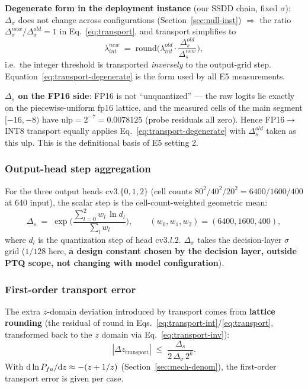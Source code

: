 \textbf{Degenerate form in the deployment instance} (our SSDD chain, fixed $\sigma$): $\Delta_\sigma$ does not change across configurations (Section~\ref{sec:null-inst}) $\Rightarrow$ the ratio $\Delta_\sigma^{new}/\Delta_\sigma^{old}=1$ in Eq.~\eqref{eq:transport}, and transport simplifies to
\begin{equation}
\lambda_{int}^{new}\;=\;\mathrm{round}\!\Big(\lambda_{int}^{old}\cdot\frac{\Delta_s^{old}}{\Delta_s^{new}}\Big),
\tag{3.26a}
\label{eq:transport-degenerate}
\end{equation}
i.e.\ the integer threshold is transported \emph{inversely} to the output-grid step.
Equation~\eqref{eq:transport-degenerate} is the form used by all E5 measurements.

\textbf{$\Delta_s$ on the FP16 side}: FP16 is not ``unquantized'' --- the raw logits lie exactly on the piecewise-uniform fp16 lattice, and the measured cells of the main segment $[-16,-8)$ have $\mathrm{ulp}=2^{-7}=0.0078125$ (probe residuals all zero).
Hence FP16$\to$INT8 transport equally applies Eq.~\eqref{eq:transport-degenerate} with $\Delta_s^{old}$ taken as this ulp.
This is the definitional basis of E5 setting 2.

\subsubsection{Output-head step aggregation}
\label{sec:head-agg}

For the three output heads $\mathrm{cv3}.\{0,1,2\}$ (cell counts $80^2/40^2/20^2=6400/1600/400$ at 640 input), the scalar step is the cell-count-weighted geometric mean:
\begin{equation}
\Delta_s \;=\; \exp\!\Big(\frac{\sum_{l=0}^{2} w_l\,\ln d_l}{\sum_l w_l}\Big),
\qquad (w_0,w_1,w_2)=(6400,1600,400),
\tag{3.28}
\label{eq:head-agg}
\end{equation}
where $d_l$ is the quantization step of head $\mathrm{cv3}.l.2$.
$\Delta_\sigma$ takes the decision-layer $\sigma$ grid ($1/128$ here, \textbf{a design constant chosen by the decision layer, outside PTQ scope, not changing with model configuration}).

\subsubsection{First-order transport error}
\label{sec:transport-error}

The extra $z$-domain deviation introduced by transport comes from \textbf{lattice rounding} (the residual of round in Eqs.~\eqref{eq:transport-int}/\eqref{eq:transport}, transformed back to the $z$ domain via Eq.~\eqref{eq:transport-inv}):
\begin{equation*}
|\Delta z_{\mathrm{transport}}| \;\le\; \frac{\Delta_s}{2\,\Delta_\sigma\, 2^{k}} .
\end{equation*}
With $\mathrm{d}\ln P_{fa}/\mathrm{d}z \approx -(z+1/z)$ (Section~\ref{sec:mech-denom}), the first-order transport error is given per case.

